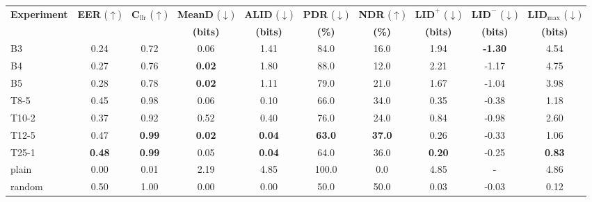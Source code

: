 \begin{tabular}{lccccccccc}
\toprule
\textbf{Experiment} & \textbf{EER} ($\uparrow$) & $\mathbf{C}_{\text{llr}}$ ($\uparrow$) & \textbf{MeanD} ($\downarrow$) & \textbf{ALID} ($\downarrow$) & \textbf{PDR} ($\downarrow$) & \textbf{NDR} ($\uparrow$) & $\mathbf{LID}^{+}$ ($\downarrow$) & $\mathbf{LID}^{-}$ ($\downarrow$) & $\mathbf{LID}_{\text{max}}$ ($\downarrow$) \\
 &  &  & \textbf{(bits)} & \textbf{(bits)} & \textbf{(\%)} & \textbf{(\%)} & \textbf{(bits)} & \textbf{(bits)} & \textbf{(bits)} \\
\midrule
B3 & 0.24 & 0.72 & 0.06 & 1.41 & 84.0 & 16.0 & 1.94 & \textbf{-1.30} & 4.54 \\
B4 & 0.27 & 0.76 & \textbf{0.02} & 1.80 & 88.0 & 12.0 & 2.21 & -1.17 & 4.75 \\
B5 & 0.28 & 0.78 & \textbf{0.02} & 1.11 & 79.0 & 21.0 & 1.67 & -1.04 & 3.98 \\
T8-5 & 0.45 & 0.98 & 0.06 & 0.10 & 66.0 & 34.0 & 0.35 & -0.38 & 1.18 \\
T10-2 & 0.37 & 0.92 & 0.52 & 0.40 & 76.0 & 24.0 & 0.84 & -0.98 & 2.60 \\
T12-5 & 0.47 & \textbf{0.99} & \textbf{0.02} & \textbf{0.04} & \textbf{63.0} & \textbf{37.0} & 0.26 & -0.33 & 1.06 \\
T25-1 & \textbf{0.48} & \textbf{0.99} & 0.05 & \textbf{0.04} & 64.0 & 36.0 & \textbf{0.20} & -0.25 & \textbf{0.83} \\
\midrule
plain & 0.00 & 0.01 & 2.19 & 4.85 & 100.0 & 0.0 & 4.85 & - & 4.86 \\
random & 0.50 & 1.00 & 0.00 & 0.00 & 50.0 & 50.0 & 0.03 & -0.03 & 0.12 \\
\bottomrule
\end{tabular}

